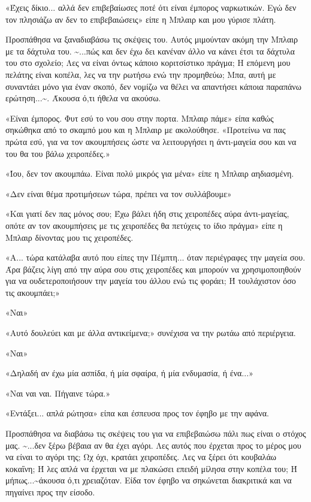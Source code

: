\documentclass[12pt,twoside, openany]{book}
\begin{document}
«Έχεις δίκιο... αλλά δεν επιβεβαίωσες ποτέ ότι είναι έμπορος ναρκωτικών. Εγώ δεν τον πλησιάζω αν δεν το επιβεβαιώσεις» είπε η Μπλαιρ και μου γύρισε πλάτη.

Προσπάθησα να ξαναδιαβάσω τις σκέψεις του. Αυτός μιμούνταν ακόμη την Μπλαιρ με τα δάχτυλα του. \textasciitilde ...πώς και δεν έχω δει κανέναν άλλο να κάνει έτσι τα δάχτυλα του στο σχολείο; Λες να είναι όντως κάποιο κοριτσίστικο πράγμα; Η επόμενη μου πελάτης είναι κοπέλα, λες να την ρωτήσω ενώ την προμηθεύω; Μπα, αυτή με συναντάει μόνο για έναν σκοπό, δεν νομίζω να θέλει να απαντήσει κάποια παραπάνω ερώτηση...\textasciitilde . Άκουσα ό,τι ήθελα να ακούσω.

«Είναι έμπορος. Φυτ εσύ το νου σου στην πορτα. Μπλαιρ πάμε» είπα καθώς σηκώθηκα από το σκαμπό μου και η Μπλαιρ με ακολούθησε. «Προτείνω να πας πρώτα εσύ, για να τον ακουμπήσεις ώστε να λειτουργήσει η άντι-μαγεία σου και να του θα του βάλω χειροπέδες.»

«Ίου, δεν τον ακουμπάω. Είναι πολύ μικρός για μένα» είπε η Μπλαιρ αηδιασμένη.

«Δεν είναι θέμα προτιμήσεων τώρα, πρέπει να τον συλλάβουμε»

«Και γιατί δεν πας μόνος σου; Έχω βάλει ήδη στις χειροπέδες αύρα άντι-μαγείας, οπότε αν τον ακουμπήσεις με τις χειροπέδες θα πετύχεις το ίδιο πράγμα» είπε η Μπλαιρ δίνοντας μου τις χειροπέδες.

«Α... τώρα κατάλαβα αυτό που είπες την Πέμπτη... όταν περιέγραφες την μαγεία σου. Άρα βάζεις λίγη από την αύρα σου στις χειροπέδες και μπορούν να χρησιμοποιηθούν για να ουδετεροποιήσουν την μαγεία του άλλου ενώ τις φοράει; Ή τουλάχιστον όσο τις ακουμπάει;»

«Ναι»

«Αυτό δουλεύει και με άλλα αντικείμενα;» συνέχισα να την ρωτάω από περιέργεια.

«Ναι»

«Δηλαδή αν έχω μία ασπίδα, ή μία σφαίρα, ή μία ενδυμασία, ή ένα...»

«Ναι ναι ναι. Πήγαινε τώρα.»

«Εντάξει... απλά ρώτησα» είπα και έσπευσα προς τον έφηβο με την αφάνα.

Προσπάθησα να διαβάσω τις σκέψεις του για να επιβεβαιώσω πάλι πως είναι ο στόχος μας. \textasciitilde ...δεν ξέρω βέβαια αν θα έχει αγόρι. Λες αυτός που έρχεται προς το μέρος μου να είναι το αγόρι της; Ωχ όχι, κρατάει χειροπέδες. Λες να ξέρει ότι κουβαλάω κοκαΐνη; Ή λες απλά να έρχεται να με πλακώσει επειδή μίλησα στην κοπέλα του; Ή μήπως...\textasciitilde  άκουσα ό,τι χρειαζόταν. Είδα τον έφηβο να σηκώνεται διακριτικά και να πηγαίνει προς την είσοδο.
\end{document}
